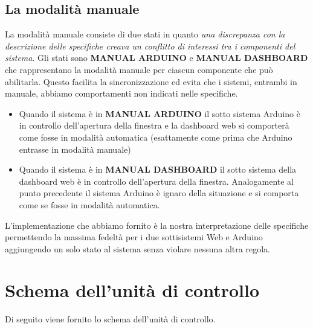 \documentclass{report}
\begin{document}
\subsection{La modalità manuale}
La modalità manuale consiste di due stati in quanto \textit{una discrepanza con la descrizione delle specifiche creava un conflitto di interessi tra i componenti del sistema}. 
Gli stati sono \textbf{MANUAL ARDUINO} e \textbf{MANUAL DASHBOARD} che rappresentano la modalità manuale per ciascun componente che può abilitarla. Questo facilita la sincronizzazione ed evita che i sistemi, entrambi in manuale, abbiamo comportamenti non indicati nelle specifiche. \\
\begin{itemize}
    \item Quando il sistema è in \textbf{MANUAL ARDUINO} il sotto sistema Arduino è in controllo dell'apertura della finestra e la dashboard web si comporterà come fosse in modalità automatica (esattamente come prima  che Arduino entrasse in modalità manuale)
    \item Quando il sistema è in \textbf{MANUAL DASHBOARD} il sotto sistema della dashboard web è in controllo dell'apertura della finestra. Analogamente al punto precedente il sistema Arduino è ignaro della situazione e si comporta come se fosse in modalità automatica. 
\end{itemize}
L'implementazione che abbiamo fornito è la nostra interpretazione delle specifiche permettendo la massima fedeltà per i due sottisistemi Web e Arduino aggiungendo un solo stato al sistema senza violare nessuna altra regola. 

\section{Schema dell'unità di controllo}
Di seguito viene fornito lo schema dell'unità di controllo.
%
%
\end{document}
